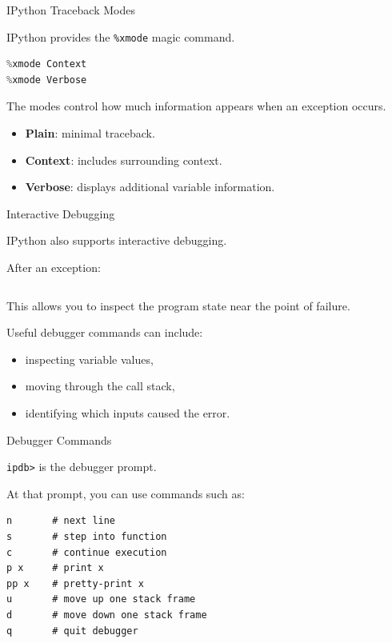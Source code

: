 \documentclass[aspectratio=43]{beamer}
\begin{document}
\begin{frame}[fragile]{IPython Traceback Modes}

IPython provides the \texttt{\%xmode} magic command.

\begin{lstlisting}[language=Python]
%xmode Plain
%xmode Context
%xmode Verbose
\end{lstlisting}

The modes control how much information appears when an exception occurs.

\begin{itemize}
  \item \textbf{Plain}: minimal traceback.
  \item \textbf{Context}: includes surrounding context.
  \item \textbf{Verbose}: displays additional variable information.
\end{itemize}

\end{frame}

\begin{frame}[fragile]{Interactive Debugging}

IPython also supports interactive debugging.

After an exception:

\begin{lstlisting}[language=Python]
%debug
\end{lstlisting}

This allows you to inspect the program state near the point of failure.

Useful debugger commands can include:

\begin{itemize}
  \item inspecting variable values,
  \item moving through the call stack,
  \item identifying which inputs caused the error.
\end{itemize}

\end{frame}

\begin{frame}[fragile]{Debugger Commands}

\texttt{ipdb>} is the debugger prompt.

At that prompt, you can use commands such as:

\begin{lstlisting}
n       # next line
s       # step into function
c       # continue execution
p x     # print x
pp x    # pretty-print x
u       # move up one stack frame
d       # move down one stack frame
q       # quit debugger
\end{lstlisting}

\end{frame}
\end{document}
